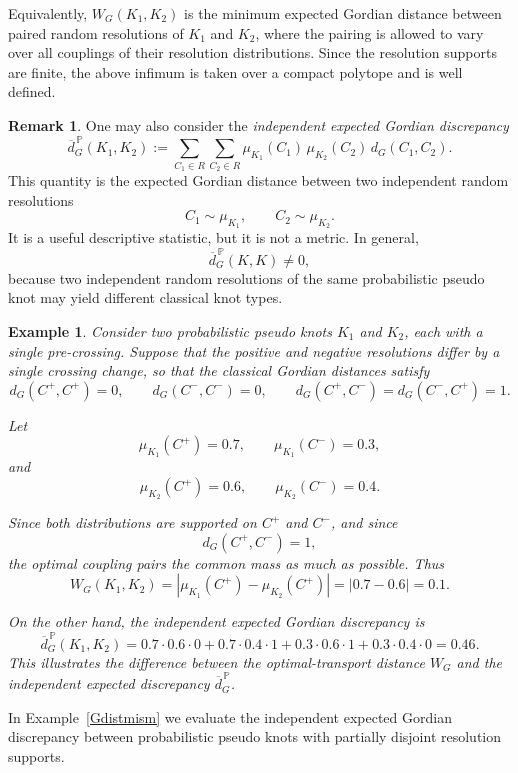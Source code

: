 \documentclass[a4paper, reqno, 12pt]{amsart}
\theoremstyle{plain}
\newtheorem{ex}[theorem]{Example}
\theoremstyle{definition}
\newtheorem{remark}[theorem]{Remark}
\begin{document}
Equivalently, \(W_G(K_1,K_2)\) is the minimum expected Gordian distance between paired random resolutions of \(K_1\) and \(K_2\), where the pairing is allowed to vary over all couplings of their resolution distributions. Since the resolution supports are finite, the above infimum is taken over a compact polytope and is well defined.

\begin{remark}\rm
One may also consider the \emph{independent expected Gordian discrepancy}
\[
\overline d_G^{\, \mathbb P}(K_1,K_2)
:=
\sum_{C_1\in R}\sum_{C_2\in R}
\mu_{K_1}(C_1)\,
\mu_{K_2}(C_2)\,
d_G(C_1,C_2).
\]
This quantity is the expected Gordian distance between two independent random resolutions
\[
C_1\sim\mu_{K_1},
\qquad
C_2\sim\mu_{K_2}.
\]
It is a useful descriptive statistic, but it is not a metric. In general,
\[
\overline d_G^{\,\mathbb P}(K,K)\neq 0,
\]
because two independent random resolutions of the same probabilistic pseudo knot may yield different classical knot types.
\end{remark}



\begin{ex}\rm
Consider two probabilistic pseudo knots $K_1$ and $K_2$, each with a single pre-crossing. Suppose that the positive and negative resolutions differ by a single crossing change, so that the classical Gordian distances satisfy
\[
d_G(C^{+},C^{+})=0,
\qquad
d_G(C^{-},C^{-})=0,
\qquad
d_G(C^{+},C^{-})=d_G(C^{-},C^{+})=1 .
\]

Let
\[
\mu_{K_1}(C^{+})=0.7,
\qquad
\mu_{K_1}(C^{-})=0.3,
\]
and
\[
\mu_{K_2}(C^{+})=0.6,
\qquad
\mu_{K_2}(C^{-})=0.4 .
\]

Since both distributions are supported on \(C^+\) and \(C^-\), and since
\[
d_G(C^+,C^-)=1,
\]
the optimal coupling pairs the common mass as much as possible. Thus
\[
W_G(K_1,K_2)
=
|\mu_{K_1}(C^+)-\mu_{K_2}(C^+)|
=
|0.7-0.6|
=
0.1.
\]

On the other hand, the independent expected Gordian discrepancy is
\[
\overline d_G^{\,\mathbb P}(K_1,K_2)
=
0.7\cdot0.6\cdot0
+
0.7\cdot0.4\cdot1
+
0.3\cdot0.6\cdot1
+
0.3\cdot0.4\cdot0
=
0.46 .
\]
This illustrates the difference between the optimal-transport distance \(W_G\) \cite{Villani2009} and the independent expected discrepancy \(\overline d_G^{\,\mathbb P}\).
\end{ex}



In Example~\ref{Gdistmism} we evaluate the independent expected Gordian discrepancy between probabilistic pseudo knots with partially disjoint resolution supports.
\end{document}
